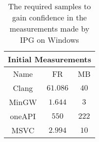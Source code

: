 \begin{table}[H]
    \centering
    \begin{tabular}{|| c | c | c ||}
    \hline
    \multicolumn{3}{||c||}{Initial Measurements} \\ [0.5ex] \hline\hline
    Name & FR & MB \\\hline
    Clang & $61.086$ & $40$ \\
    MinGW & $1.644$ & $3$ \\
    oneAPI & $550$ & $222$ \\
    MSVC & $2.994$ & $10$ \\\hline
    \end{tabular}
    \caption{The required samples to gain confidence in the measurements made by IPG on Windows}
    \label{tab:initial-measurements}
\end{table}